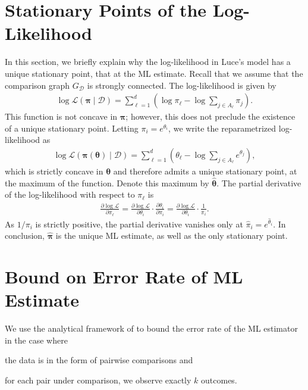 \newcommand{\D}[2]{\ensuremath{\mathcal{D}_{#1 \succ #2}}}

\section{Stationary Points of the Log-Likelihood}

In this section, we briefly explain why the log-likelihood in Luce's model has a unique stationary point, that at the ML estimate.
Recall that we assume that the comparison graph $G_{\mathcal{D}}$ is strongly connected.
The log-likelihood is given by
\begin{align}
\label{fix:eq:loglik}
\log \mathcal{L}(\bm{\pi} \mid \mathcal{D}) = \sum_{\ell = 1}^d \left( \log \pi_\ell - \log{\sum_{j \in A_\ell} \pi_j} \right).
\end{align}
This function is not concave in $\bm{\pi}$; however, this does not preclude the existence of a unique stationary point.
Letting $\pi_i = e^{\theta_i}$, we write the reparametrized log-likelihood as
\begin{align*}
\log \mathcal{L}(\bm{\pi}(\bm{\theta}) \mid \mathcal{D}) = \sum_{\ell = 1}^d \left( \theta_\ell - \log{\sum_{j \in A_\ell} e^{\theta_j}} \right),
\end{align*}
which is strictly concave in $\bm{\theta}$ and therefore admits a unique stationary point, at the maximum of the function.
Denote this maximum by $\hat{\bm{\theta}}$.
The partial derivative of the log-likelihood with respect to $\pi_\ell$ is
\begin{align}
\frac{\partial \log \mathcal{L}}{\partial \pi_\ell}
  = \frac{\partial \log \mathcal{L}}{\partial \theta_i} \cdot \frac{\partial \theta_i}{\partial \pi_i}
  = \frac{\partial \log \mathcal{L}}{\partial \theta_i} \cdot \frac{1}{\pi_i}.
\end{align}
As $1/\pi_i$ is strictly positive, the partial derivative vanishes only at $\hat{\pi}_i = e^{\hat{\theta}_i}$.
In conclusion, $\hat{\bm{\pi}}$ is the unique ML estimate, as well as the only stationary point.


\section{Bound on Error Rate of ML Estimate}

We use the analytical framework of \citet{negahban2017rank} to bound the error rate of the ML estimator in the case where
\begin{enuminline}
\item the data is in the form of pairwise comparisons and
\item for each pair under comparison, we observe exactly $k$ outcomes.
\end{enuminline}

